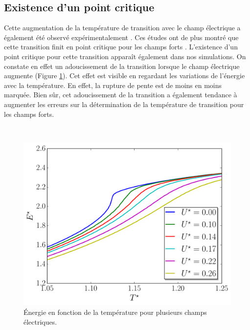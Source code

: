 \documentclass[11pt]{article}
\numberwithin{equation}{section}
\begin{document}
\subsection{Existence d'un point critique}
Cette augmentation de la température de transition avec le champ électrique a également été observé expérimentalement \cite{mfieldExperiment,efieldExperiment,efieldExperiment2}. Ces études ont de plus montré que cette transition finit en point critique pour les champs forts \cite{efieldExperiment}. L'existence d'un point critique pour cette transition apparaît également dans nos simulations. On constate en effet un adoucissement de la transition lorsque le champ électrique augmente (Figure \ref{deriveenergie}). Cet effet est visible en regardant les variations de l'énergie avec la température. En effet, la rupture de pente est de moins en moins marquée. Bien sûr, cet adoucissement de la transition a également tendance à augmenter les erreurs sur la détermination de la température de transition pour les champs forts.
\newpage


\ 
\vspace{3cm}

\begin{figure}[h!]
    \centering	    
	\includegraphics[scale=0.6]{figures/electricField_calo.pdf}
    \caption{Énergie en fonction de la température pour plusieurs champs électriques.}
    	\label{deriveenergie} 
\end{figure}

\newpage

\end{document}
